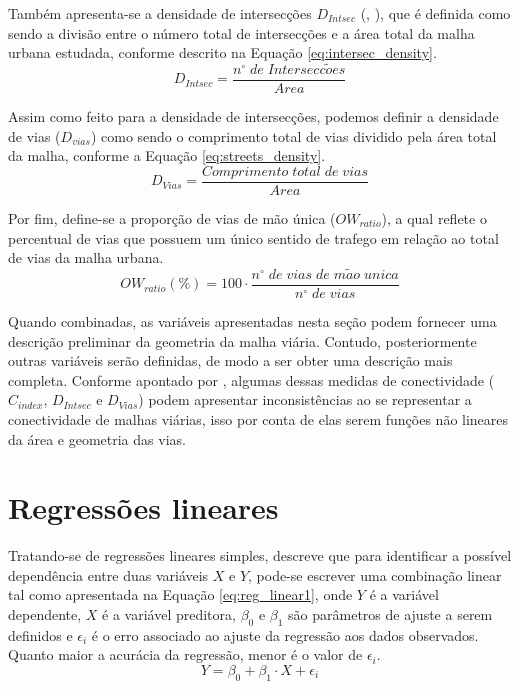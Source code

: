 Também apresenta-se a densidade de intersecções $D_{Intsec}$ (, \citeyear{Marshall_metrics}), que é definida como sendo a divisão entre o número total de intersecções e a área total da malha urbana estudada, conforme descrito na Equação \ref{eq:intersec_density}.
%
\begin{equation} \label{eq:intersec_density}
    D_{Intsec} = \frac{n^{\circ}\;de\;Intersecc\tilde{o}es}{Area}
\end{equation}

Assim como feito para a densidade de intersecções, podemos definir a densidade de vias ($D_{vias}$) como sendo o comprimento total de vias dividido pela área total da malha, conforme a Equação \ref{eq:streets_density}.
%
\begin{equation} \label{eq:streets_density}
    D_{Vias} = \frac{Comprimento \; total \; de \; vias}{Area}
\end{equation}

Por fim, define-se a proporção de vias de mão única ($OW_{ratio}$), a qual reflete o percentual de vias que possuem um único sentido de trafego em relação ao total de vias da malha urbana.  
%
\begin{equation} \label{eq:ow_ratio}
    OW_{ratio}(\%) = 100 \cdot \frac{n^{\circ}\;de\;vias\;de\;m\tilde{a}o\;unica}{n^{\circ}\;de\;vias}
\end{equation}

Quando combinadas, as variáveis apresentadas nesta seção podem fornecer uma descrição preliminar da geometria da malha viária. 
Contudo, posteriormente outras variáveis serão definidas, de modo a ser obter uma descrição mais completa.
Conforme apontado por , algumas dessas medidas de conectividade ($C_{index}$, $D_{Intsec}$ e $D_{Vias}$) podem apresentar inconsistências ao se representar a conectividade de malhas viárias, isso por conta de elas serem funções não lineares da área e geometria das vias. 

\section{Regressões lineares} \label{RegressoesLineares}

Tratando-se de regressões lineares simples,  descreve que para identificar a possível dependência entre duas variáveis $X$ e $Y$, pode-se escrever uma combinação linear tal como apresentada na Equação \ref{eq:reg_linear1}, onde  $Y$ é a variável dependente, $X$ é a variável preditora, $\beta_{0}$ e $\beta_{1}$ são parâmetros de ajuste a serem definidos e $\epsilon_{i}$ é o erro associado ao ajuste da regressão aos dados observados. 
Quanto maior a acurácia da regressão, menor é o valor de $\epsilon_{i}$.
%
\begin{equation} \label{eq:reg_linear1}
    Y = \beta_{0}+\beta_{1}\cdot X+\epsilon_{i}
\end{equation}

